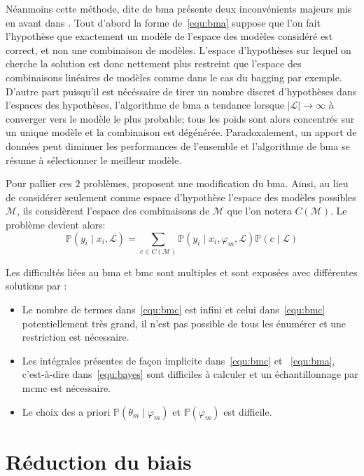 Néanmoins cette méthode, dite de \ac{bma} présente deux inconvénients majeurs mis en avant dans \citet{Minka2002}. Tout d'abord la forme de~\ref{equ:bma} suppose que l'on fait l'hypothèse que exactement un modèle de l'espace des modèles considéré est correct, et non une combinaison de modèles. L'espace d'hypothèses sur lequel on cherche la solution est donc nettement plus restreint que l'espace des combinaisons linéaires de modèles comme dans le cas du \ac{bagging} par exemple. D'autre part puisqu'il est nécéssaire de tirer un nombre discret d'hypothèses dans l'espaces des hypothèses, l'algorithme de \ac{bma} a tendance lorsque $\vert \mathcal{L} \vert \to \infty$ à converger vers le modèle le plus probable; tous les poids sont alors concentrés sur un unique modèle et la combinaison est dégénérée. Paradoxalement, un apport de données peut diminuer les performances de l'ensemble et l'algorithme de \ac{bma} se résume à sélectionner le meilleur modèle.

Pour pallier ces $2$ problèmes, \citet{Monteith2011b} proposent une modification du \ac{bma}. Ainsi, au lieu de considérer seulement comme espace d'hypothèse l'espace des modèles possibles $\mathcal{M}$, ils considèrent l'espace des combinaisons de $\mathcal{M}$ que l'on notera $C ( \mathcal{M} )$. Le problème devient alors:
\begin{equation}
    \mathbb{P} ( y_i \mid x_i , \mathcal{L} ) = \sum_{c \in C ( \mathcal{M} )} \mathbb{P} (y_i \mid x_i,  \varphi_m , \mathcal{L}) \mathbb{P} ( c \mid \mathcal{L} )
    \label{equ:bmc}
\end{equation}

Les difficultés liées au \ac{bma} et \ac{bmc} sont multiples et sont exposées avec différentes solutions par \citet{Hoeting1999b}:
\begin{itemize}
    \item Le nombre de termes dans~\ref{equ:bmc} est infini et celui dans~\ref{equ:bmc} potentiellement très grand, il n'est pas possible de tous les énumérer et une restriction est nécessaire.
    \item Les intégrales présentes de façon implicite dans~\ref{equ:bmc} et ~\ref{equ:bma}, c'est-à-dire dans~\ref{equ:bayes} sont difficiles à calculer et un échantillonnage par \ac{mcmc} est nécessaire.
    \item Le choix des a priori $\mathbb{P} ( \theta_m \mid \varphi_m )$ et $\mathbb{P} ( \varphi_m )$ est difficile.
\end{itemize}

\section{Réduction du biais}
